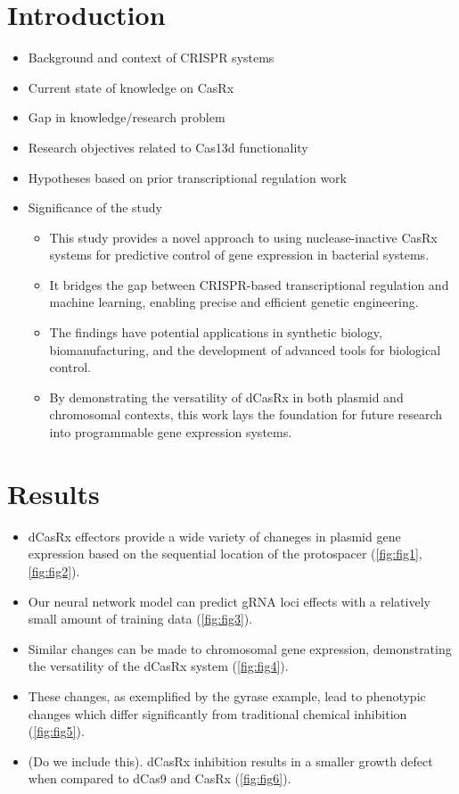 \documentclass[12pt]{article}
\begin{document}
\section*{Introduction}
\begin{itemize}
    \item Background and context of CRISPR systems \textsuperscript{\citep{abudayyeh2017}}
    \item Current state of knowledge on CasRx \textsuperscript{\citep{konermann2018}}
    \item Gap in knowledge/research problem
    \item Research objectives related to Cas13d functionality \textsuperscript{\citep{yan2018}}
    \item Hypotheses based on prior transcriptional regulation work \textsuperscript{\citep{GILBERT2014647}}
    \item Significance of the study
    \begin{itemize}
        \item This study provides a novel approach to using nuclease-inactive CasRx systems for predictive control of gene expression in bacterial systems.
        \item It bridges the gap between CRISPR-based transcriptional regulation and machine learning, enabling precise and efficient genetic engineering.
        \item The findings have potential applications in synthetic biology, biomanufacturing, and the development of advanced tools for biological control.
        \item By demonstrating the versatility of dCasRx in both plasmid and chromosomal contexts, this work lays the foundation for future research into programmable gene expression systems.
    \end{itemize}
\end{itemize}

\section*{Results}
\begin{itemize}
    \item dCasRx effectors provide a wide variety of chaneges in plasmid gene expression based on the sequential location of the protospacer (\ref{fig:fig1}, \ref{fig:fig2}).
    \item Our neural network model can predict gRNA loci effects with a relatively small amount of training data (\ref{fig:fig3}).
    \item Similar changes can be made to chromosomal gene expression, demonstrating the versatility of the dCasRx system (\ref{fig:fig4}).
    \item These changes, as exemplified by the gyrase example, lead to phenotypic changes which differ significantly from traditional chemical inhibition (\ref{fig:fig5}).
    \item (Do we include this). dCasRx inhibition results in a smaller growth defect when compared to dCas9 and CasRx (\ref{fig:fig6}).
\end{itemize}
\end{document}
